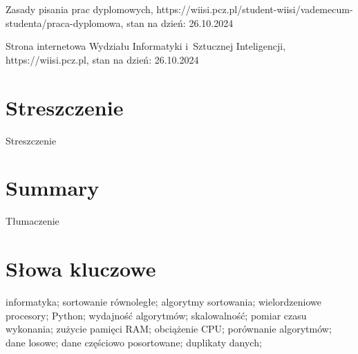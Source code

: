 \documentclass{PracaDyplomowa-Szablon}
\begin{document}
\cleardoublepage
\begin{thebibliography}{99}


 Zasady pisania prac dyplomowych, https://wiisi.pcz.pl/student-wiisi/vademecum-studenta/praca-dyplomowa, stan na dzień: 26.10.2024

 Strona internetowa Wydziału Informatyki i~Sztucznej Inteligencji, https://wiisi.pcz.pl, stan na dzień: 26.10.2024

\end{thebibliography}

\listoffigures
{}

\listoftables
{}

\lstlistoflistings
{}

\chapter*{Streszczenie}

Streszczenie

\chapter*{Summary}

Tłumaczenie

\chapter*{Słowa kluczowe}

\noindent informatyka;
\noindent sortowanie równoległe;
\noindent algorytmy sortowania;
\noindent wielordzeniowe procesory;
\noindent Python;
\noindent wydajność algorytmów;
\noindent skalowalność;
\noindent pomiar czasu wykonania;
\noindent zużycie pamięci RAM;
\noindent obciążenie CPU;
\noindent porównanie algorytmów;
\noindent dane losowe;
\noindent dane częściowo posortowane;
\noindent duplikaty danych;
\end{document}
